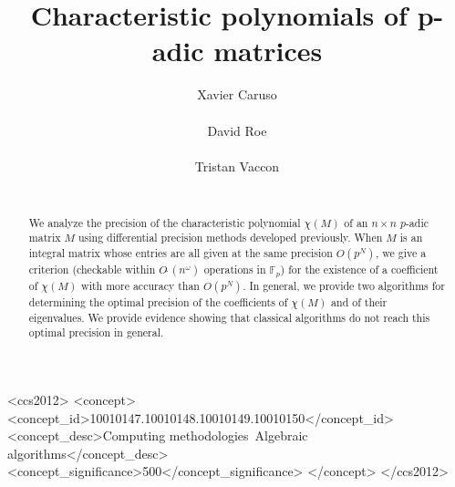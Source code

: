\documentclass{sig-alternate-05-2015}
\newcommand{\Fp}{\mathbb{F}_p}
\newcommand{\softO}{O\tilde{~}}
\begin{document}
\newtheorem{theo}{Theorem}[section]
\newtheorem{lem}[theo]{Lemma}
\newtheorem{prop}[theo]{Proposition}
\newtheorem{cor}[theo]{Corollary}
\newtheorem{quest}[theo]{Question}
\newtheorem{conj}[theo]{Conjecture}
\theoremstyle{definition}
\newtheorem{rem}[theo]{Remark}
\newtheorem{ex}[theo]{Example}
\newtheorem{deftn}[theo]{Definition}

\title{Characteristic polynomials of p-adic matrices}

\author{
\alignauthor Xavier Caruso\\
  \\
\alignauthor David Roe\\
  \\
\alignauthor Tristan Vaccon\\
  \\
}

\maketitle

\begin{abstract}
We analyze the precision of the characteristic polynomial $\chi(M)$ of 
an $n \times n$ $p$-adic matrix $M$ using differential precision methods 
developed previously.  When $M$ is an integral matrix whose entries are 
all given at the same precision $O(p^N)$, we give a criterion (checkable 
within $\softO(n^\omega)$ operations in $\Fp$) for the existence of a
coefficient of $\chi(M)$ with more accuracy than $O(p^N)$.
In general, we provide two algorithms for determining the optimal 
precision of the coefficients of $\chi(M)$ and of their eigenvalues.
We provide evidence showing that classical algorithms do not reach
this optimal precision in general.
\end{abstract}

\begin{CCSXML}
<ccs2012>
<concept>
<concept_id>10010147.10010148.10010149.10010150</concept_id>
<concept_desc>Computing methodologies~Algebraic algorithms</concept_desc>
<concept_significance>500</concept_significance>
</concept>
</ccs2012>
\end{CCSXML}

\vspace{-1mm}
\printccsdesc
\end{document}
